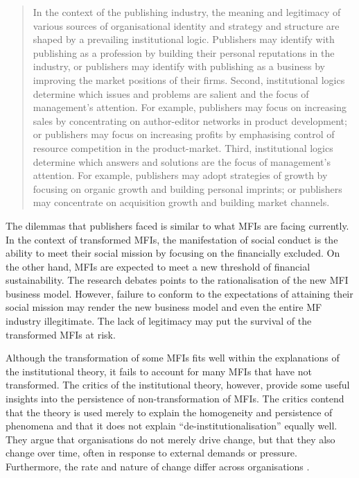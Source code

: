 \documentclass[a4paper,nobind]{templates/ociamthesis}
\begin{document}
\begin{quote}
In the context of the publishing industry, the meaning and legitimacy of various sources of organisational identity and strategy and structure are shaped by a prevailing institutional logic. Publishers may identify with publishing as a profession by building their personal reputations in the industry, or publishers may identify with publishing as a business by improving the market positions of their firms. Second, institutional logics determine which issues and problems are salient and the focus of management's attention. For example, publishers may focus on increasing sales by concentrating on author-editor networks in product development; or publishers may focus on increasing profits by emphasising control of resource competition in the product-market. Third, institutional logics determine which answers and solutions are the focus of management's attention. For example, publishers may adopt strategies of growth by focusing on organic growth and building personal imprints; or publishers may concentrate on acquisition growth and building market channels\autocite{thornton2002rise}.
\end{quote}

The dilemmas that publishers faced is similar to what MFIs are facing currently. In the context of transformed MFIs, the manifestation of social conduct is the ability to meet their social mission by focusing on the financially excluded. On the other hand, MFIs are expected to meet a new threshold of financial sustainability. The research debates points to the rationalisation of the new MFI business model. However, failure to conform to the expectations of attaining their social mission may render the new business model and even the entire MF industry illegitimate. The lack of legitimacy may put the survival of the transformed MFIs at risk.

Although the transformation of some MFIs fits well within the explanations of the institutional theory, it fails to account for many MFIs that have not transformed. The critics of the institutional theory, however, provide some useful insights into the persistence of non-transformation of MFIs. The critics contend that the theory is used merely to explain the homogeneity and persistence of phenomena and that it does not explain ``de-institutionalisation'' equally well. They argue that organisations do not merely drive change, but that they also change over time, often in response to external demands or pressure. Furthermore, the rate and nature of change differ across organisations \autocite{tina2002institutional}.
\end{document}

